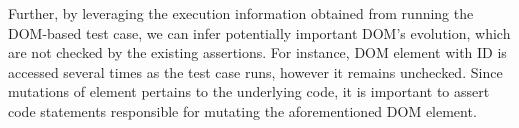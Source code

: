 Further, by leveraging the execution information obtained from running the DOM-based test case, we can infer potentially important DOM's evolution, which are not checked by the existing assertions. For instance, DOM element with ID  is accessed several times as the test case runs, however it remains unchecked. Since mutations of  element pertains to the underlying \javascript code, it is important to assert code statements responsible for mutating the aforementioned DOM element.             

%
%
 


